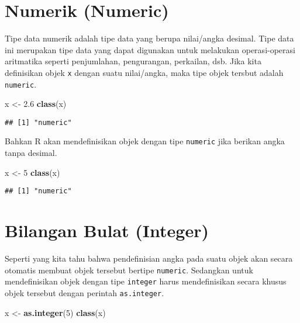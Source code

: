 \documentclass[
]{book}
\newenvironment{Shaded}{\begin{snugshade}}{\end{snugshade}}
\newcommand{\DecValTok}[1]{\textcolor[rgb]{0.00,0.00,0.81}{#1}}
\newcommand{\FloatTok}[1]{\textcolor[rgb]{0.00,0.00,0.81}{#1}}
\newcommand{\KeywordTok}[1]{\textcolor[rgb]{0.13,0.29,0.53}{\textbf{#1}}}
\newcommand{\NormalTok}[1]{#1}
\newcommand{\StringTok}[1]{\textcolor[rgb]{0.31,0.60,0.02}{#1}}
\begin{document}
\hypertarget{numeric}{%
\section{Numerik (Numeric)}\label{numeric}}

Tipe data numerik adalah tipe data yang berupa nilai/angka desimal. Tipe data ini merupakan tipe data yang dapat digunakan untuk melakukan operasi-operasi aritmatika seperti penjumlahan, pengurangan, perkailan, dsb. Jika kita definisikan objek \texttt{x} dengan suatu nilai/angka, maka tipe objek tersbut adalah \texttt{numeric}.

\begin{Shaded}
\begin{Highlighting}[]
\NormalTok{x <-}\StringTok{ }\FloatTok{2.6}
\KeywordTok{class}\NormalTok{(x)}
\end{Highlighting}
\end{Shaded}

\begin{verbatim}
## [1] "numeric"
\end{verbatim}

Bahkan R akan mendefinisikan objek dengan tipe \texttt{numeric} jika berikan angka tanpa desimal.

\begin{Shaded}
\begin{Highlighting}[]
\NormalTok{x <-}\StringTok{ }\DecValTok{5}
\KeywordTok{class}\NormalTok{(x)}
\end{Highlighting}
\end{Shaded}

\begin{verbatim}
## [1] "numeric"
\end{verbatim}

\hypertarget{integer}{%
\section{Bilangan Bulat (Integer)}\label{integer}}

Seperti yang kita tahu bahwa pendefinisian angka pada suatu objek akan secara otomatis membuat objek tersebut bertipe \texttt{numeric}. Sedangkan untuk mendefinisikan objek dengan tipe \texttt{integer} harus mendefinisikan secara khusus objek tersebut dengan perintah \texttt{as.integer}.

\begin{Shaded}
\begin{Highlighting}[]
\NormalTok{x <-}\StringTok{ }\KeywordTok{as.integer}\NormalTok{(}\DecValTok{5}\NormalTok{)}
\KeywordTok{class}\NormalTok{(x)}
\end{Highlighting}
\end{Shaded}
\end{document}
